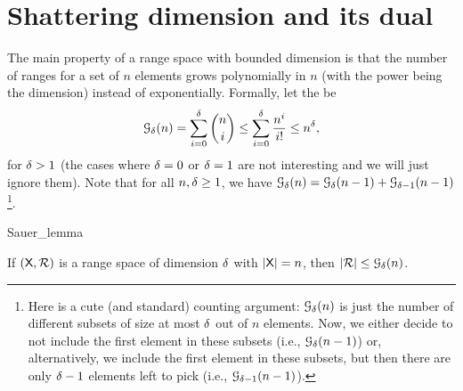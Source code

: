 


\section{Shattering dimension and its dual}%


The main property of a range space with bounded \VC dimension is that
the number of ranges for a set of $n$ elements grows polynomially in
$n$ (with the power being the dimension) instead of exponentially.
Formally, let the  be
\begin{equation}
    \Growth{\Dim}{n} = \sum_{i=0}^{\Dim} \binom{n}{i}
    \leq \sum_{i=0}^{\Dim} \frac{n^i}{i!}
    \leq n^\Dim,
    \eqlab{g:d:n:estimate}
\end{equation}
for $\delta>1$ (the cases where $\delta=0$ or $\delta=1$ are not interesting
and we will just ignore them).  Note that for all $n,\delta \geq 1$, we
have $\Growth{\Dim}{n} = \Growth{\Dim}{n-1} +
\Growth{\Dim-1}{n-1}$\footnote{Here is a cute (and standard) counting
   argument: $\Growth{\Dim}{n}$ is just the number of different
   subsets of size at most $\delta$ out of $n$ elements. Now, we either
   decide to not include the first element in these subsets (i.e.,
   $\Growth{\Dim}{n-1}$) or, alternatively, we include the first
   element in these subsets, but then there are only $\delta-1$ elements
   left to pick (i.e., $\Growth{\Dim-1}{n-1}$).}.


\begin{fragment}{Sauer_lemma}
    \begin{lemma}
        If $(\textsf{X},{\mathcal{R}})$ is a range space of \VC dimension
        $\delta$ with $|\textsf{X}| = n$, then $|\RangeSet| \leq
        \Growth{\Dim}{n}$.        
    \end{lemma}
\end{fragment}

